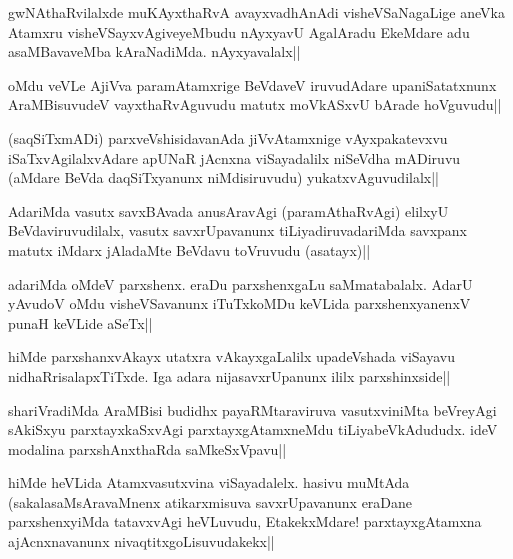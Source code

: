 \begin{artha}%
gwNAthaRvilalxde muKAyxthaRvA avayxvadhAnAdi visheVSaNagaLige aneVka Atamxru visheVSayxvAgiveyeMbudu nAyxyavU AgalAradu EkeMdare adu asaMBavaveMba kAraNadiMda. nAyxyavalalx||
\end{artha}

\begin{artha}
oMdu veVLe AjiVva paramAtamxrige BeVdaveV iruvudAdare upaniSatatxnunx AraMBisuvudeV vayxthaRvAguvudu matutx moVkASxvU bArade hoVguvudu||  
\end{artha}

\begin{artha}
(saqSiTxmADi) parxveVshisidavanAda jiVvAtamxnige vAyxpakatevxvu iSaTxvAgilalxvAdare apUNaR jAcnxna viSayadalilx niSeVdha mADiruvu (aMdare BeVda daqSiTxyanunx niMdisiruvudu) yukatxvAguvudilalx||
\end{artha}


\begin{artha}
AdariMda vasutx savxBAvada anusAravAgi (paramAthaRvAgi) elilxyU BeVdaviruvudilalx, vasutx savxrUpavanunx tiLiyadiruvadariMda savxpanx matutx iMdarx jAladaMte BeVdavu toVruvudu (asatayx)||
\end{artha}

\begin{artha}
adariMda oMdeV parxshenx. eraDu parxshenxgaLu saMmatabalalx. AdarU yAvudoV oMdu visheVSavanunx iTuTxkoMDu keVLida parxshenxyanenxV punaH keVLide aSeTx||
\end{artha}%

\begin{artha}
hiMde parxshanxvAkayx utatxra vAkayxgaLalilx upadeVshada viSayavu nidhaRrisalapxTiTxde. Iga adara nijasavxrUpanunx ililx parxshinxside||
\end{artha}


\begin{artha}
shariVradiMda AraMBisi budidhx payaRMtaraviruva vasutxviniMta beVreyAgi sAkiSxyu parxtayxkaSxvAgi parxtayxgAtamxneMdu tiLiyabeVkAdududx. ideV modalina parxshAnxthaRda saMkeSxVpavu||
\end{artha}

\begin{artha}
hiMde heVLida Atamxvasutxvina viSayadalelx. hasivu muMtAda (sakalasaMsAravaMnenx atikarxmisuva savxrUpavanunx eraDane parxshenxyiMda tatavxvAgi heVLuvudu, EtakekxMdare! parxtayxgAtamxna ajAcnxnavanunx nivaqtitxgoLisuvudakekx||
\end{artha}

